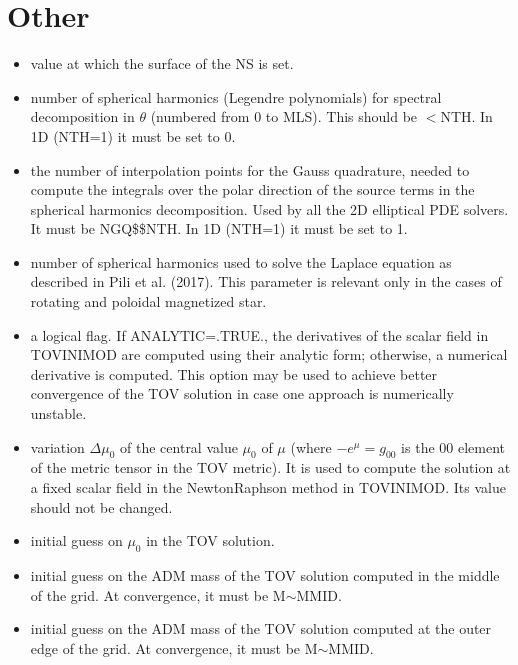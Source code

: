 \documentclass[letterpaper,10pt,english]{sphinxmanual}
\begin{document}
\section{Other}
\label{\detokenize{user_params:other}}\begin{itemize}
\item {} 
\sphinxAtStartPar
{} \sphinxhyphen{} value at which the surface of the NS is set.


\item {} 
\sphinxAtStartPar
{} \sphinxhyphen{} number of spherical harmonics (Legendre polynomials) for spectral decomposition in \(\theta\) (numbered from 0 to MLS). This should be \(< \)NTH. In 1D (NTH=1) it must be set to 0.


\item {} 
\sphinxAtStartPar
{} \sphinxhyphen{} the number of interpolation points for the Gauss quadrature, needed to compute the integrals
over the polar direction of the source terms in the spherical harmonics decomposition. Used by all the
2D elliptical PDE solvers. It must be NGQ\$\$NTH. In 1D (NTH=1) it must be set to 1.


\item {} 
\sphinxAtStartPar
{} \sphinxhyphen{} number of spherical harmonics used to solve the Laplace equation as described in Pili et al.
(2017). This parameter is relevant only in the cases of rotating and poloidal magnetized star.


\item {} 
\sphinxAtStartPar
{} \sphinxhyphen{} a logical flag. If ANALYTIC=.TRUE., the derivatives of the scalar field in TOVINIMOD are computed using their analytic form; otherwise, a numerical derivative is computed. This option may be used to achieve better convergence of the TOV solution in case one approach is numerically unstable.


\item {} 
\sphinxAtStartPar
{} \sphinxhyphen{} variation \(\Delta \mu _0\) of the central value \(\mu _0\) of \(\mu\) (where \(-e^\mu = g _{00}\) is the \(00\) element of the metric tensor in the TOV metric). It is used to compute the solution at a fixed scalar field in the Newton\sphinxhyphen{}Raphson method in TOVINIMOD. Its value should not be changed.


\item {} 
\sphinxAtStartPar
{} \sphinxhyphen{} initial guess on \(\mu _0\) in the TOV solution.


\item {} 
\sphinxAtStartPar
{} \sphinxhyphen{} initial guess on the ADM mass of the TOV solution computed in the middle of the grid. At convergence, it must be M\(\sim\)MMID.


\item {} 
\sphinxAtStartPar
{} \sphinxhyphen{} initial guess on the ADM mass of the TOV solution computed at the outer edge of the grid. At convergence, it must be M\(\sim\)MMID.

\end{itemize}
\end{document}
